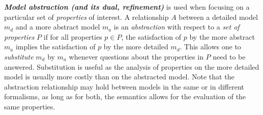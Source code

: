 \noindent
\textbf{\emph{Model abstraction (and its dual, refinement)}} is used when focusing on 
    a particular set of \emph{properties} of interest. A relationship $A$ between a detailed model 
    $m_d$ and a more abstract model $m_a$ is an \emph{abstraction} with respect to a 
    \emph{set of properties} $P$ if for all properties $p \in P$, the satisfaction of $p$ by the more abstract $m_a$ implies the satisfaction of $p$ by the more detailed $m_d$. 
    This allows one to \emph{substitute} $m_d$ by $m_a$ whenever questions about the properties in $P$ need to be answered. Substitution is useful as the analysis of properties on the more detailed model is usually more costly
    than on the abstracted model.
    Note that the abstraction relationship may hold between models in the same or in different formalisms, as long as for both, the semantics allows for the evaluation of the same properties.
    
